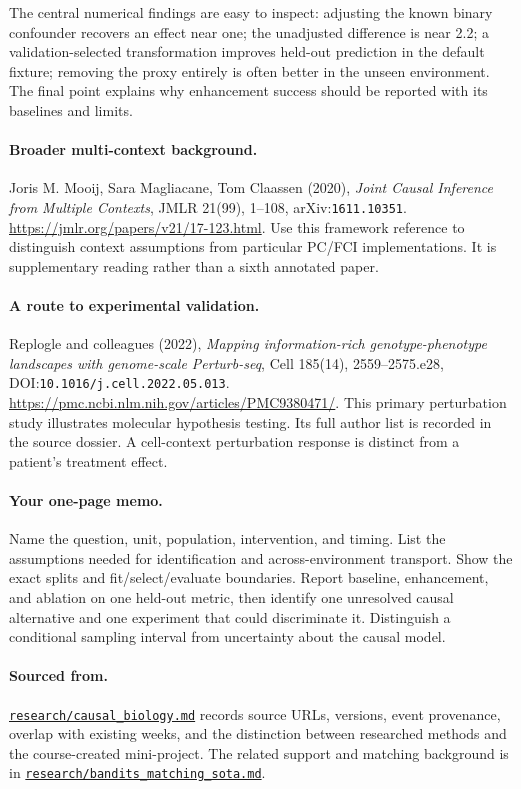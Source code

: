 \documentclass[11pt]{scrartcl}
\begin{document}
The central numerical findings are easy to inspect: adjusting the known binary
confounder recovers an effect near one; the unadjusted difference is near 2.2; a
validation-selected transformation improves held-out prediction in the default fixture;
removing the proxy entirely is often better in the unseen environment. The final
point explains why enhancement success should be reported with its baselines and limits.

\paragraph{Broader multi-context background.} Joris M. Mooij, Sara Magliacane,
Tom Claassen (2020), \emph{Joint Causal Inference from Multiple Contexts}, JMLR
21(99), 1--108, arXiv:\texttt{1611.10351}.
\url{https://jmlr.org/papers/v21/17-123.html}.
Use this framework reference to distinguish context assumptions from particular
PC/FCI implementations. It is supplementary reading rather than a sixth annotated paper.

\paragraph{A route to experimental validation.} Replogle and colleagues (2022),
\emph{Mapping information-rich genotype-phenotype landscapes with genome-scale
Perturb-seq}, Cell 185(14), 2559--2575.e28, DOI:\texttt{10.1016/j.cell.2022.05.013}.
\url{https://pmc.ncbi.nlm.nih.gov/articles/PMC9380471/}.
This primary perturbation study illustrates molecular hypothesis testing. Its full
author list is recorded in the source dossier. A cell-context perturbation response
is distinct from a patient's treatment effect.

\paragraph{Your one-page memo.} Name the question, unit, population, intervention,
and timing. List the assumptions needed for identification and across-environment
transport. Show the exact splits and fit/select/evaluate boundaries. Report baseline,
enhancement, and ablation on one held-out metric, then identify one unresolved causal
alternative and one experiment that could discriminate it. Distinguish a conditional
sampling interval from uncertainty about the causal model.

\paragraph{Sourced from.}
\href{../research/causal_biology.md}{\texttt{research/causal\_biology.md}}
records source URLs, versions, event provenance, overlap with existing weeks, and
the distinction between researched methods and the course-created mini-project.
The related support and matching background is in
\href{../research/bandits_matching_sota.md}{\texttt{research/bandits\_matching\_sota.md}}.
\end{document}
